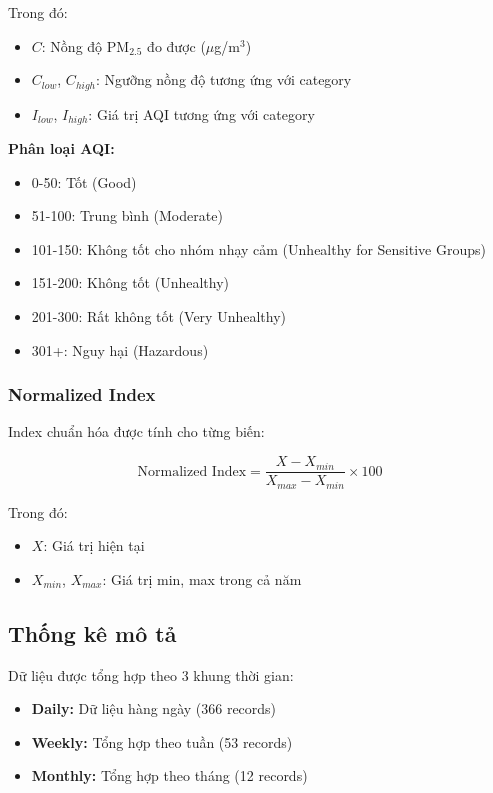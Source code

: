 \documentclass[12pt,a4paper]{article}
\newcommand{\ugm}{$\mu$g/m$^3$}
\newcommand{\pmtwofive}{PM$_{2.5}$}
\begin{document}
Trong đó:
\begin{itemize}
    \item $C$: Nồng độ \pmtwofive{} đo được (\ugm{})
    \item $C_{low}$, $C_{high}$: Ngưỡng nồng độ tương ứng với category
    \item $I_{low}$, $I_{high}$: Giá trị AQI tương ứng với category
\end{itemize}

\textbf{Phân loại AQI:}
\begin{itemize}
    \item 0-50: Tốt (Good)
    \item 51-100: Trung bình (Moderate)
    \item 101-150: Không tốt cho nhóm nhạy cảm (Unhealthy for Sensitive Groups)
    \item 151-200: Không tốt (Unhealthy)
    \item 201-300: Rất không tốt (Very Unhealthy)
    \item 301+: Nguy hại (Hazardous)
\end{itemize}

\subsubsection{Normalized Index}
Index chuẩn hóa được tính cho từng biến:

\begin{equation}
\text{Normalized Index} = \frac{X - X_{min}}{X_{max} - X_{min}} \times 100
\end{equation}

Trong đó:
\begin{itemize}
    \item $X$: Giá trị hiện tại
    \item $X_{min}$, $X_{max}$: Giá trị min, max trong cả năm
\end{itemize}

\subsection{Thống kê mô tả}

Dữ liệu được tổng hợp theo 3 khung thời gian:
\begin{itemize}
    \item \textbf{Daily:} Dữ liệu hàng ngày (366 records)
    \item \textbf{Weekly:} Tổng hợp theo tuần (53 records)
    \item \textbf{Monthly:} Tổng hợp theo tháng (12 records)
\end{itemize}
\end{document}
